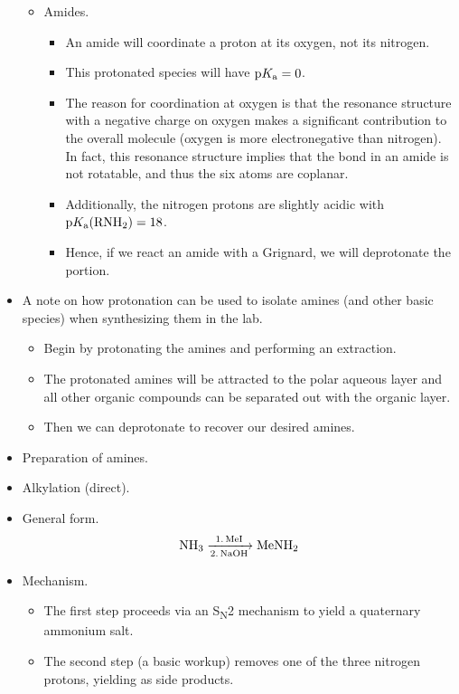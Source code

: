 \documentclass[../notes.tex]{subfiles}
\begin{document}
\begin{itemize}
\begin{itemize}
        \item Amides.
        \begin{itemize}
            \item An amide will coordinate a proton at its oxygen, not its nitrogen.
            \item This protonated species will have $\text{p}K_\text{a}=0$.
            \item The reason for coordination at oxygen is that the resonance structure with a negative charge on oxygen makes a significant contribution to the overall molecule (oxygen is more electronegative than nitrogen). In fact, this resonance structure implies that the  bond in an amide is not rotatable, and thus the six atoms  are coplanar.
            \item Additionally, the nitrogen protons are slightly acidic with $\pKa(\ce{RNH2})=18$.
            \item Hence, if we react an amide with a Grignard, we will deprotonate the  portion.
        \end{itemize}
    \end{itemize}
    \item A note on how protonation can be used to isolate amines (and other basic species) when synthesizing them in the lab.
    \begin{itemize}
        \item Begin by protonating the amines and performing an extraction.
        \item The protonated amines will be attracted to the polar aqueous layer and all other organic compounds can be separated out with the organic layer.
        \item Then we can deprotonate to recover our desired amines.
    \end{itemize}
    \item Preparation of amines.
    \item Alkylation (direct).
    \item General form.
    \begin{equation*}
        \ce{NH3 ->[1. MeI][2. NaOH] MeNH2}
    \end{equation*}
    \item Mechanism.
    \begin{itemize}
        \item The first step proceeds via an S\textsubscript{N}2 mechanism to yield a quaternary ammonium salt.
        \item The second step (a basic workup) removes one of the three nitrogen protons, yielding  as side products.

\end{itemize}
\end{itemize}
\end{document}
